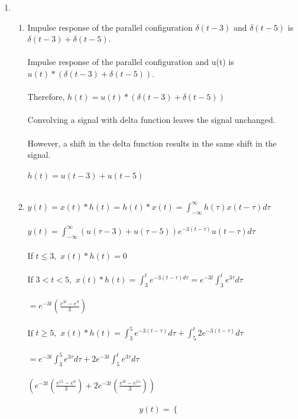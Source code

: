 \documentclass[10pt,a4paper, margin=1in]{article}
\begin{document}
\begin{enumerate}
\item %
    \begin{enumerate}
    \item %
    Impulse response of the parallel configuration $\delta(t-3)$ and $\delta(t-5)$ is $\delta(t-3) + \delta(t-5)$.\\\\ Impulse response of the parallel configuration and u(t) is $u(t)*(\delta(t-3) + \delta(t-5))$.\\\\
    Therefore, $h(t)= u(t)*(\delta(t-3) + \delta(t-5))$\\\\
    Convolving a signal with delta function leaves the signal unchanged.\\\\ However, a shift in the delta function results in the same shift in the signal.\\\\
    $h(t) = u(t-3) + u(t-5)$\\\\
    \item %
    $y(t) = x(t)*h(t) = h(t)*x(t) = \int^{\infty}_{-\infty}h(\tau)x(t-\tau)d\tau$\\\\
    $y(t) = \int^{\infty}_{-\infty}(u(\tau -3) + u(\tau -5))e^{-3(t-\tau)}u(t-\tau)d\tau$\\\\
    If $t \leq 3,$ $x(t)*h(t) = 0$\\\\
    If $3 < t < 5,$ $x(t)*h(t) = \int^{t}_{3}e^{-3(t-\tau)d\tau} = e^{-3t}\int^{t}_{3}e^{3\tau}d\tau$\\\\
    $= e^{-3t}(\frac{e^{3t} - e^{9}}{3})$\\\\
    If $t \geq 5,$ $x(t)*h(t) = \int^{5}_{3}e^{-3(t-\tau)}d\tau + \int^{t}_{5}2e^{-3(t-\tau)}d\tau$\\\\
    $= e^{-3t}\int^{5}_{3}e^{3\tau}d\tau + 2e^{-3t}\int^{t}_{5}e^{3\tau}d\tau$\\\\
    $(e^{-3t}(\frac{e^{15}-e^{9}}{3}) +2e^{-3t}(\frac{e^{3t} -e^{15}}{3}))$\\\\
    		\[
		y(t) =
		\begin{cases}

\end{cases}\]
\end{enumerate}
\end{enumerate}
\end{document}
